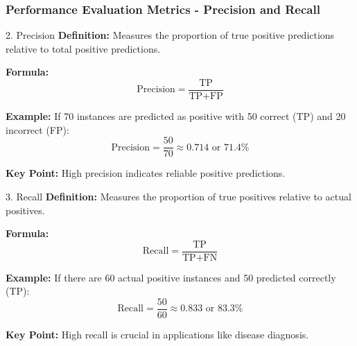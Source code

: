 \documentclass[aspectratio=169]{beamer}
\begin{document}
\begin{frame}[fragile]
    \frametitle{Performance Evaluation Metrics - Precision and Recall}
    \begin{block}{2. Precision}
        \textbf{Definition:} Measures the proportion of true positive predictions relative to total positive predictions.
        
        \textbf{Formula:}
        \begin{equation}
            \text{Precision} = \frac{\text{TP}}{\text{TP} + \text{FP}}
        \end{equation}

        \textbf{Example:} 
        If 70 instances are predicted as positive with 50 correct (TP) and 20 incorrect (FP):
        \[
        \text{Precision} = \frac{50}{70} \approx 0.714 \text{ or } 71.4\%
        \]

        \textbf{Key Point:} 
        High precision indicates reliable positive predictions.
    \end{block}

    \begin{block}{3. Recall}
        \textbf{Definition:} Measures the proportion of true positives relative to actual positives.
        
        \textbf{Formula:}
        \begin{equation}
            \text{Recall} = \frac{\text{TP}}{\text{TP} + \text{FN}}
        \end{equation}

        \textbf{Example:} 
        If there are 60 actual positive instances and 50 predicted correctly (TP):
        \[
        \text{Recall} = \frac{50}{60} \approx 0.833 \text{ or } 83.3\%
        \]

        \textbf{Key Point:} 
        High recall is crucial in applications like disease diagnosis.
    \end{block}
\end{frame}
\end{document}
